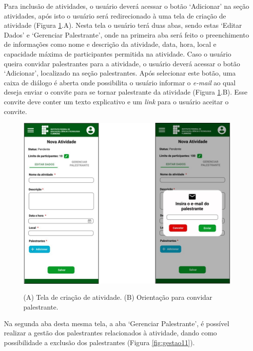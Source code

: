 Para inclusão de atividades, o usuário deverá acessar o botão ‘Adicionar’ na seção atividades, após isto o usuário será redirecionado à uma tela de criação de atividade (Figura \ref{fig:gestao9}.A). Nesta tela o usuário terá duas abas, sendo estas ‘Editar Dados’ e ‘Gerenciar Palestrante’, onde na primeira aba será feito o preenchimento de informações como nome e descrição da atividade, data, hora, local e capacidade máxima de participantes permitida na atividade. Caso o usuário queira convidar palestrantes para a atividade, o usuário deverá acessar o botão ‘Adicionar’, localizado na seção palestrantes. Após selecionar este botão, uma caixa de diálogo é aberta onde possibilita o usuário informar o \textit{e-mail} ao qual deseja enviar o convite para se tornar palestrante da atividade (Figura \ref{fig:gestao9}.B). Esse convite deve conter um texto explicativo e um \textit{link} para o usuário aceitar o convite.

\begin{figure}[H]
    \centering
    \caption{(A) Tela de criação de atividade. (B) Orientação para convidar palestrante.}
    \includegraphics[scale=0.63]{figuras/Gestao/9-10.jpg}
    \label{fig:gestao9}
\end{figure}

Na segunda aba desta mesma tela, a aba ‘Gerenciar Palestrante’, é possível realizar a gestão dos palestrantes relacionados à atividade, dando como possibilidade a exclusão dos palestrantes (Figura \ref{fig:gestao11}).

